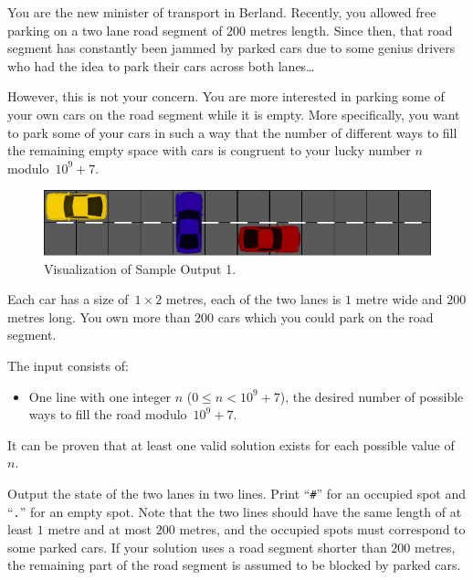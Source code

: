 %
You are the new minister of transport in Berland.
Recently, you allowed free parking on a two lane road segment of $200$ metres length.
Since then, that road segment has constantly been jammed by parked cars due to some
genius drivers who had the idea to park their cars across both lanes\dots

However, this is not your concern.
You are more interested in parking some of your own cars on the road segment while it is empty.
More specifically, you want to park some of your cars in such a way that the number of different ways to fill the remaining empty space with cars is congruent to your lucky number $n$ modulo~$10^9+7$.


\begin{figure}[h]
	\centering
	\includegraphics{sample}
	\caption{Visualization of Sample Output 1.}
\end{figure}

Each car has a size of~$1\times2$ metres, each of the two lanes is $1$ metre wide and $200$ metres long.
You own more than $200$ cars which you could park on the road segment.

\begin{Input}
	The input consists of:
	\begin{itemize}
		\item One line with one integer $n$ ($0\leq n<10^9+7$), the desired number of possible ways to fill the road modulo~$10^9+7$.
	\end{itemize}
	It can be proven that at least one valid solution exists for each possible value of~$n$.
\end{Input}

\begin{Output}
	Output the state of the two lanes in two lines.
	Print ``\texttt{\#}'' for an occupied spot and ``\texttt{.}'' for an empty spot.
	Note that the two lines should have the same length of at least $1$ metre and at most $200$ metres,
        and the occupied spots must correspond to some parked cars.
	If your solution uses a road segment shorter than $200$ metres,
        the remaining part of the road segment is assumed to be blocked by parked cars. 
\end{Output}
